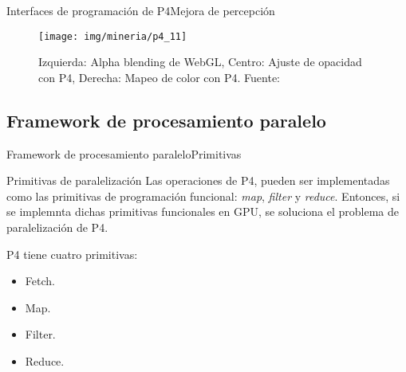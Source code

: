 \documentclass[10pt]{beamer}
\newcommand{\1}{
        	\setbeamertemplate{background}{
        		\texttt{[image: img/1]}
        		\tikz[overlay] \fill[fill opacity=0.75,fill=white] (0,0) rectangle (-\paperwidth,\paperheight);
        	}
}
\begin{document}
\begin{frame}{Interfaces de programación de P4}{Mejora de percepción}
	\begin{figure}[]
		\centering
		\texttt{[image: img/mineria/p4\_11]}
		\caption{Izquierda: Alpha blending de WebGL, Centro: Ajuste de opacidad con P4, Derecha: Mapeo de color con P4. Fuente: \cite{li2018p4}}
	\end{figure}
\end{frame}




\subsection{Framework de procesamiento paralelo}



\begin{frame}{Framework de procesamiento paralelo}{Primitivas}
	\begin{block}{Primitivas de paralelización}
		Las operaciones de P4, pueden ser implementadas como las primitivas de programación funcional: \textit{map}, \textit{filter} y \textit{reduce}. Entonces, si se implemnta dichas primitivas funcionales en GPU, se soluciona el problema de paralelización de P4. 
		
		\vspace{0.3cm}
		
		P4 tiene cuatro primitivas:
		
		\begin{itemize}
			\item Fetch.
			\item Map.
			\item Filter.
			\item Reduce.
		\end{itemize}
		
	\end{block}
\end{frame}
\end{document}
